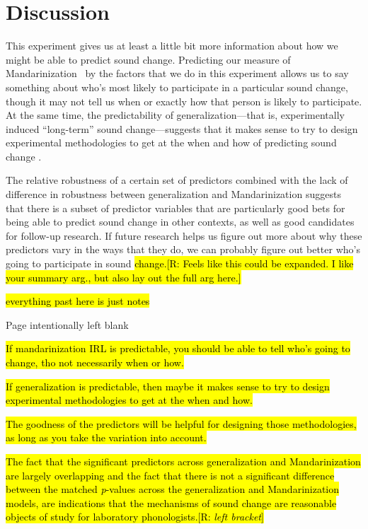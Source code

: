 \section{Discussion}
\label{sec:microcosmDiscussion}

This experiment gives us at least a little bit more information about how we might be able to predict sound change. Predicting our measure of Mandarinization \IRL~by the factors that we do in this experiment allows us to say something about who's most likely to participate in a particular sound change, though it may not tell us when or exactly how that person is likely to participate. At the same time, the predictability of generalization---that is, experimentally induced ``long-term'' sound change---suggests that it makes sense to try to design experimental methodologies to get at the when and how of predicting sound change \IRL.

The relative robustness of a certain set of predictors combined with the lack of difference in robustness between generalization and Mandarinization suggests that there is a subset of predictor variables that are particularly good bets for being able to predict sound change in other contexts, as well as good candidates for follow-up research. If future research helps us figure out more about why these predictors vary in the ways that they do, we can probably figure out better who's going to participate in sound \hl{change.[R: Feels like this could be expanded. I like your summary arg., but also lay out the full arg here.]}

\hl{everything past here is just notes}

\pagebreak

Page intentionally left blank

\pagebreak


\hl{If mandarinization IRL is predictable, you should be able to tell who's going to change, tho not necessarily when or how.}

\hl{If generalization is predictable, then maybe it makes sense to try to design experimental methodologies to get at the when and how.}

\hl{The goodness of the predictors will be helpful for designing those methodologies, as long as you take the variation into account.}

\hl{The fact that the significant predictors across generalization and Mandarinization are largely overlapping and the fact that there is not a significant difference between the matched \textit{p}-values across the generalization and Mandarinization models, are indications that the mechanisms of sound change are reasonable objects of study for laboratory phonologists.[R: \textit{left bracket}]}

